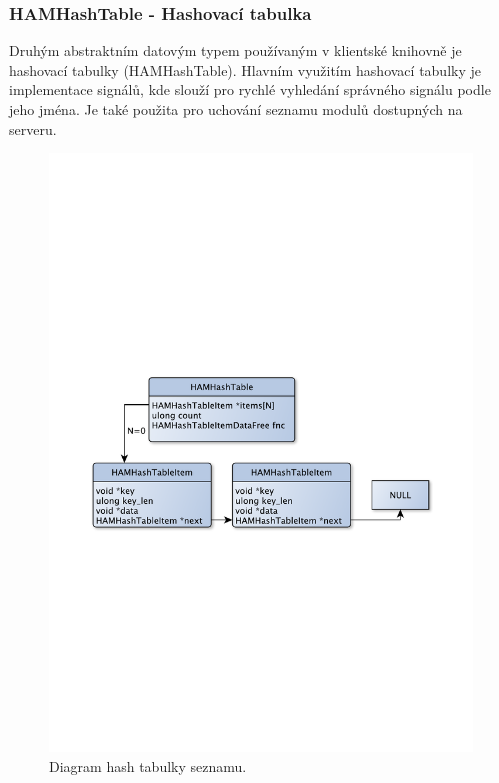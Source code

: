 \subsubsection{HAMHashTable - Hashovací tabulka}

Druhým abstraktním datovým typem používaným v klientské knihovně je hashovací tabulky (HAMHashTable).
Hlavním využitím hashovací tabulky je implementace signálů, kde slouží pro rychlé vyhledání
správného signálu podle jeho jména. Je také použita pro uchování seznamu modulů dostupných na serveru.

\begin{figure}[h]
\centering
\includegraphics[trim=8cm 8cm 8cm 8cm, scale=0.6]{fig/hash}
\caption{Diagram hash tabulky seznamu.}
\label{fig:hamhashtable}
\end{figure}

